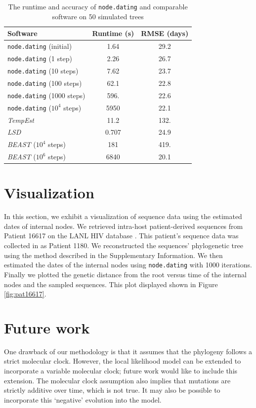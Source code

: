 \documentclass{bioinfo}
\newcommand{\code}[1]{{\tt #1}}
\begin{document}
\begin{table}[t]
	\caption[Runtime and accuracy]{The runtime and accuracy of \code{node.dating} and comparable software on 50 simulated trees}
	\label{tab:runtime}
	\centering
	\begin{tabular}{lcc}
		\hline
		Software & Runtime (s) & RMSE (days) \\
		\hline
		\code{node.dating} (initial) & 1.64 & 29.2 \\
		\code{node.dating} (1 step) & 2.26 & 26.7 \\
		\code{node.dating} (10 steps) & 7.62 & 23.7 \\
		\code{node.dating} (100 steps) & 62.1 & 22.8 \\
		\code{node.dating} (1000 steps) & 596. & 22.6 \\
		\code{node.dating} ($10^4$ steps) & 5950 & 22.1 \\
		\emph{TempEst} & 11.2 & 132. \\
		\emph{LSD} & 0.707 & 24.9 \\
		\emph{BEAST} ($10^4$ steps) & 181 & 419. \\
		\emph{BEAST} ($10^6$ steps) & 6840 & 20.1 \\
		\hline
	\end{tabular}
\end{table}

\section{Visualization} \label{sec:vis}
In this section, we exhibit a visualization of sequence data using the estimated dates of internal nodes.
We retrieved intra-host patient-derived sequences from Patient 16617 on the LANL HIV database \citep{LosAlamos}.
This patient's sequence data was collected in \cite{Llewellyn06} as Patient 1180.
We reconstructed the sequences' phylogenetic tree using the method described in the Supplementary Information.
We then estimated the dates of the internal nodes using \code{node.dating} with 1000 iterations. Finally we plotted the genetic distance from the root versus time of the internal nodes and the sampled sequences. This plot displayed shown in Figure \ref{fig:pat16617}.

\section{Future work} \label{sec:discuss}
One drawback of our methodology is that it assumes that the phylogeny follows a strict molecular clock.
However, the local likelihood model can be extended to incorporate a variable molecular clock; future work would like to include this extension.
The molecular clock assumption also implies that mutations \showthe\parskip are strictly additive over time, which is not true.
It may also be possible to incorporate this `negative' evolution into the model.
\end{document}
